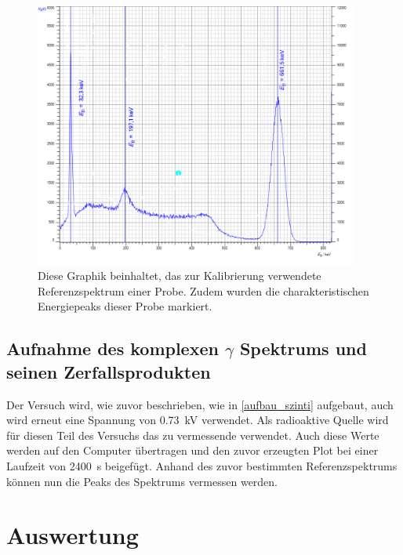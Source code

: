 \documentclass[12pt,english,ngerman]{scrartcl}
\begin{document}
\begin{figure}[H]
	\begin{center}
		\includegraphics[width = 0.95\textwidth]{./figures/c137kalibrierung.png}
	\end{center}
	\caption[Kalibrierungsmessung einer ]{
		Diese Graphik beinhaltet, das
		zur Kalibrierung verwendete Referenzspektrum einer  Probe.
		Zudem wurden die charakteristischen Energiepeaks dieser Probe markiert.
	}\label{fig:kalibrierung}
\end{figure}

\subsection{Aufnahme des komplexen \texorpdfstring{$\gamma$}{gamma}
	Spektrums und seinen Zerfallsprodukten}\label{sec:aufname_Ra_zerfallsreihe}

Der Versuch wird, wie zuvor beschrieben, wie in \autoref{aufbau_szinti}
aufgebaut, auch wird erneut eine Spannung von \SI{0.73}{\kilo\volt} verwendet.
Als radioaktive Quelle wird für diesen Teil des Versuchs das zu vermessende
 verwendet. Auch diese Werte werden auf den Computer
übertragen und den zuvor erzeugten Plot bei einer Laufzeit von
\SI{2400}{\second} beigefügt. Anhand des zuvor bestimmten Referenzspektrums
können nun die Peaks des  Spektrums vermessen werden.

\section{Auswertung}\label{sec:Auswertung}
\end{document}
